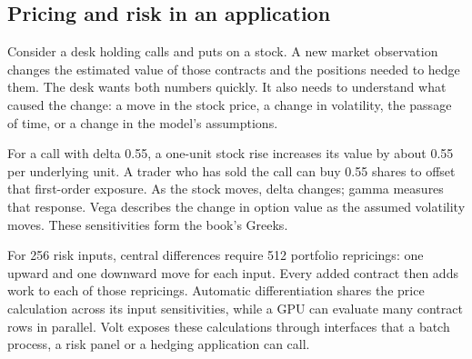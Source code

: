 \documentclass[8pt]{strategynet-journal}
\begin{document}
\begin{SNcolumns}
\section{Pricing and risk in an application}
Consider a desk holding calls and puts on a stock. A new market observation
changes the estimated value of those contracts and the positions needed to
hedge them. The desk wants both numbers quickly. It also needs to understand
what caused the change: a move in the stock price, a change in volatility, the
passage of time, or a change in the model's assumptions.

For a call with delta 0.55, a one-unit stock rise increases its value by about
0.55 per underlying unit. A trader who has sold the call can buy 0.55 shares
to offset that first-order exposure. As the stock moves, delta changes; gamma
measures that response. Vega describes the change in option value as the
assumed volatility moves. These sensitivities form the book's Greeks.

For 256 risk inputs, central differences require 512 portfolio repricings:
one upward and one downward move for each input. Every added contract then
adds work to each of those repricings. Automatic differentiation shares the
price calculation across its input sensitivities, while a GPU can evaluate
many contract rows in parallel. Volt exposes these calculations through
interfaces that a batch process, a risk panel or a hedging application can call.


\end{SNcolumns}
\end{document}
